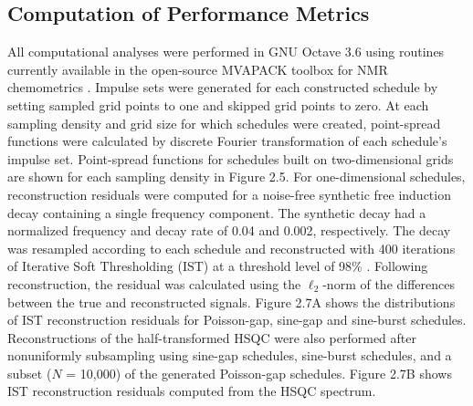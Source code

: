 \subsection{Computation of Performance Metrics}

\begin{doublespace}
All computational analyses were performed in GNU Octave 3.6 \cite{eaton2008}
using routines currently available in the open-source MVAPACK toolbox for
NMR chemometrics \cite{worley:acscb2014}. Impulse sets were generated for
each constructed schedule by setting sampled grid points to one and skipped
grid points to zero. At each sampling density and grid size for which schedules
were created, point-spread functions were calculated by discrete Fourier
transformation of each schedule's impulse set. Point-spread functions for
schedules built on two-dimensional grids are shown for each sampling density
in Figure 2.5. For one-dimensional schedules, reconstruction residuals were
computed for a noise-free synthetic free induction decay containing a single
frequency component. The synthetic decay had a normalized frequency and decay
rate of 0.04 and 0.002, respectively. The decay was resampled according to each
schedule and reconstructed with 400 iterations of Iterative Soft Thresholding
(IST) at a threshold level of 98\% \cite{hyberts:jbnmr2012}. Following
reconstruction, the residual was calculated using the $\ell_2$-norm of the
differences between the true and reconstructed signals. Figure 2.7A shows the
distributions of IST reconstruction residuals for Poisson-gap, sine-gap and
sine-burst schedules. Reconstructions of the half-transformed HSQC were also
performed after nonuniformly subsampling using sine-gap schedules, sine-burst
schedules, and a subset ($N$ = 10,000) of the generated Poisson-gap schedules.
Figure 2.7B shows IST reconstruction residuals computed from the HSQC spectrum.
\end{doublespace}

